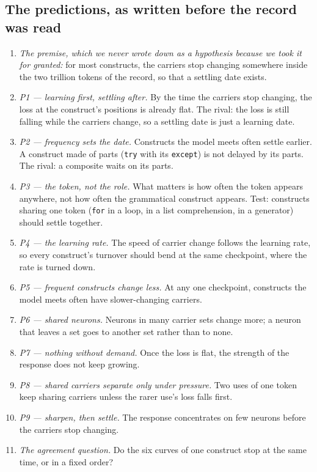 \documentclass{article}
\begin{document}
\subsection{The predictions, as written before the record was read}

\begin{enumerate}[topsep=2pt,itemsep=1pt,parsep=0pt,partopsep=0pt,leftmargin=*]
\item \emph{The premise, which we never wrote down as a hypothesis because we took it for granted:} for most constructs, the carriers stop changing somewhere inside the two trillion tokens of the record, so that a settling date exists.
\item \emph{P1 --- learning first, settling after.} By the time the carriers stop changing, the loss at the construct's positions is already flat. The rival: the loss is still falling while the carriers change, so a settling date is just a learning date.
\item \emph{P2 --- frequency sets the date.} Constructs the model meets often settle earlier. A construct made of parts (\texttt{try} with its \texttt{except}) is not delayed by its parts. The rival: a composite waits on its parts.
\item \emph{P3 --- the token, not the role.} What matters is how often the token appears anywhere, not how often the grammatical construct appears. Test: constructs sharing one token (\texttt{for} in a loop, in a list comprehension, in a generator) should settle together.
\item \emph{P4 --- the learning rate.} The speed of carrier change follows the learning rate, so every construct's turnover should bend at the same checkpoint, where the rate is turned down.
\item \emph{P5 --- frequent constructs change less.} At any one checkpoint, constructs the model meets often have slower-changing carriers.
\item \emph{P6 --- shared neurons.} Neurons in many carrier sets change more; a neuron that leaves a set goes to another set rather than to none.
\item \emph{P7 --- nothing without demand.} Once the loss is flat, the strength of the response does not keep growing.
\item \emph{P8 --- shared carriers separate only under pressure.} Two uses of one token keep sharing carriers unless the rarer use's loss falls first.
\item \emph{P9 --- sharpen, then settle.} The response concentrates on few neurons before the carriers stop changing.
\item \emph{The agreement question.} Do the six curves of one construct stop at the same time, or in a fixed order?
\end{enumerate}
\end{document}
